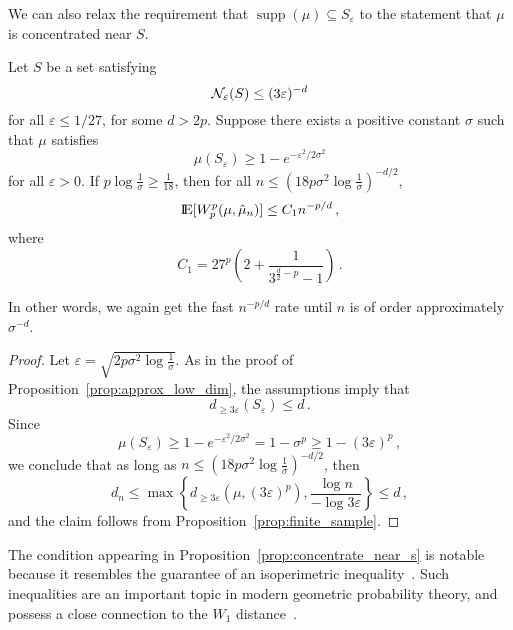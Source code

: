 \documentclass[sts]{imsart}
\newcommand*{\ep}{\varepsilon}
\DeclareMathOperator{\supp}{supp}
\begin{document}
We can also relax the requirement that $\supp(\mu) \subseteq S_\ep$ to the statement that $\mu$ is concentrated near $S$.
\begin{proposition}\label{prop:concentrate_near_s}
Let $S$ be a set satisfying
\begin{equation*}
\cN_{\ep}(S) \leq (3 \ep)^{-d}
\end{equation*}
for all $\ep \leq 1/27$, for some $d > 2p$.
Suppose there exists a positive constant $\sigma$ such that $\mu$ satisfies
\begin{equation*}
\mu(S_\ep) \geq 1 - e^{-\ep^2/2 \sigma^2}
\end{equation*}
for all $\ep > 0$.
If $p \log \frac 1 \sigma \geq \frac{1}{18}$, then for all $n \leq \left(18p \sigma^2 \log \frac 1 \sigma\right)^{-d/2}$,
\begin{equation*}
{\rm I}\kern-0.18em{\rm E}[W_p^p(\mu, \hat \mu_n)] \leq C_1 n^{-p/d}\,,
\end{equation*}
where
\begin{equation*}
C_1 = 27^p\left(2+\frac{1}{3^{\frac{d}{2} - p} -1}\right)\,.
\end{equation*}
\end{proposition}
In other words, we again get the fast $n^{-p/d}$ rate until $n$ is of order approximately $\sigma^{-d}$.

\begin{proof}
Let $\ep = \sqrt{2 p \sigma^2 \log \frac 1 \sigma}$.
As in the proof of Proposition~\ref{prop:approx_low_dim}, the assumptions imply that
\begin{equation*}
d_{\geq 3 \ep}(S_\ep) \leq d\,.
\end{equation*}
Since
\begin{equation*}
\mu(S_\ep) \geq 1 - e^{-\ep^2/2 \sigma^2} = 1 - \sigma^p \geq 1 - (3 \ep)^p\,,
\end{equation*}
we conclude that as long as $n \leq \left(18p \sigma^2 \log \frac 1 \sigma\right)^{-d/2}$, then
\begin{equation*}
d_n \leq \max\left\{d_{\geq 3 \ep}(\mu, (3\ep)^p), \frac{\log n}{- \log 3 \ep}\right\} \leq d\,,
\end{equation*}
and the claim follows from Proposition~\ref{prop:finite_sample}.
\end{proof}

The condition appearing in Proposition~\ref{prop:concentrate_near_s} is notable because it resembles the guarantee of an isoperimetric inequality~\cite{ledoux2005concentration}.
Such inequalities are an important topic in modern geometric probability theory, and possess a close connection to the $W_1$ distance~\cite{BobGoe99}.
\end{document}
